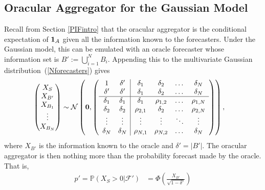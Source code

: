 \documentclass[11pt]{article}
\renewcommand{\P}{\mathbb{P}}
\theoremstyle{definition}
\theoremstyle{definition}
\def\one{{\bf 1}}
\def\P{{\mathbb P}}
\begin{document}
\subsection{Oracular Aggregator for the Gaussian Model}
\label{oracular}
Recall from Section \ref{PIFintro} that the oracular aggregator is the
conditional expectation of $\one_A$ given all the information known to the
forecasters. Under the Gaussian model, this can be
emulated with an oracle forecaster whose information set is
$B' := \bigcup_{i=1}^N B_i$.  Appending this to the multivariate
Gaussian distribution~(\ref{Nforecasters}) gives
\begin{align}
\left(\begin{matrix} X_S \\ X_{B'} \\ X_{B_1}\\ \vdots \\ X_{B_N} 
 \end{matrix}\right) &\sim \mathcal{N}\left( 
 \boldsymbol{0}, 
% 
 \left(\begin{array}{c c| c c cc }
1 & \delta' & \delta_1 & \delta_2 & \dots & \delta_N  \\ 
\delta' & \delta' & \delta_1 & \delta_2 & \dots & \delta_N  \\ \hline
\delta_1& \delta_1 & \delta_1 &\rho_{1,2} & \dots & \rho_{1,N}   \\ 
\delta_2 & \delta_2 &\rho_{2,1} & \delta_2 & \dots & \rho_{2,N}  \\ 
\vdots &\vdots & \vdots & \vdots & \ddots & \vdots  \\ 
\delta_N &\delta_N & \rho_{N,1} & \rho_{N,2} & \dots & \delta_N\\ 
 \end{array}\right)\right), \label{oracleN}
\end{align}
where $X_{B'}$ is the information known to the oracle and $\delta' =
|B'|$. The oracular aggregator is then nothing more than the probability forecast made by the oracle. That is,
 \begin{align*}
p' = \P(X_S > 0 |  \mathcal{F}') 
   &= \Phi\left( \frac{X_{B'}}{\sqrt{1-\delta'}} \right)
\end{align*}
\end{document}
